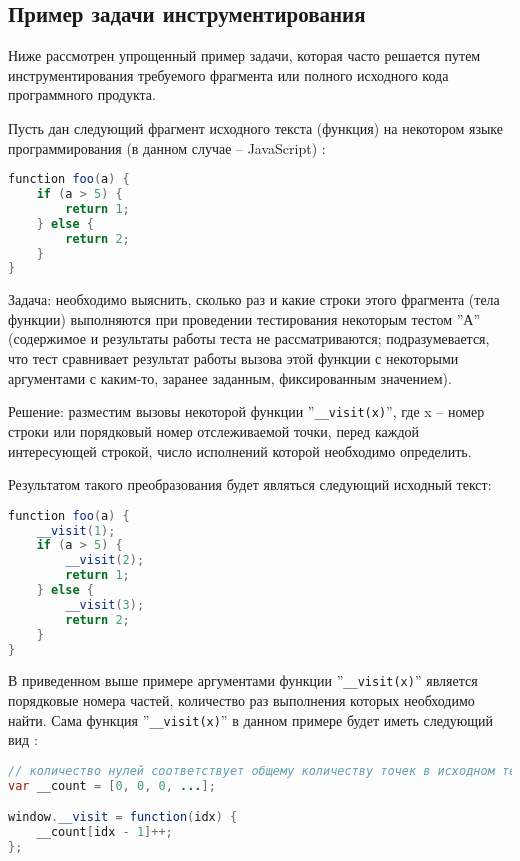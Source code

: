 \subsection{Пример задачи инструментирования}
Ниже рассмотрен упрощенный пример задачи, которая часто решается путем инструментирования требуемого фрагмента или полного исходного кода программного продукта.

Пусть дан следующий фрагмент исходного текста (функция) на некотором языке программирования (в данном случае -- JavaScript) \cite{instrumentiruieto}:
\begin{lstlisting}[frame=single, language=Java]
function foo(a) {
    if (a > 5) {
        return 1;
    } else {
        return 2;
    }
}
\end{lstlisting}

Задача: необходимо выяснить, сколько раз и какие строки этого фрагмента (тела функции) выполняются при проведении тестирования некоторым тестом ''А'' (содержимое и результаты работы теста не рассматриваются; подразумевается, что тест сравнивает результат работы вызова этой функции с некоторыми аргументами с каким-то, заранее заданным, фиксированным значением).

Решение: разместим вызовы некоторой функции ''\lstinline{__visit(x)}'', где x -- номер строки или порядковый номер отслеживаемой точки, перед каждой интересующей строкой, число исполнений которой необходимо определить.

Результатом такого преобразования будет являться следующий исходный текст:
\begin{lstlisting}[frame=single, language=Java]
function foo(a) {
    __visit(1);
    if (a > 5) {
        __visit(2);
        return 1;
    } else {
        __visit(3);
        return 2;
    }
}
\end{lstlisting}

В приведенном выше примере аргументами функции ''\lstinline{__visit(x)}'' является порядковые номера частей, количество раз выполнения которых необходимо найти.
Сама функция ''\lstinline{__visit(x)}'' в данном примере будет иметь следующий вид \cite{instrumentiruieto}:
\begin{lstlisting}[frame=single, language=Java]
// количество нулей соответствует общему количеству точек в исходном тексте, число исполнений которых необходимо измерить
var __count = [0, 0, 0, ...];

window.__visit = function(idx) {
    __count[idx - 1]++;
};
\end{lstlisting}

